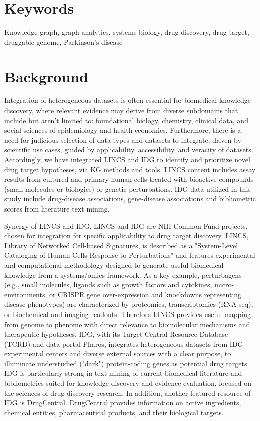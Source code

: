 \section{Keywords}
Knowledge graph, graph analytics, systems biology, drug discovery, drug target, druggable genome, Parkinson's disease

\section{Background}

Integration of heterogeneous datasets is often essential for biomedical knowledge discovery, where relevant evidence may derive from diverse subdomains that include but aren't limited to: foundational biology, chemistry, clinical data, and social sciences of epidemiology and health economics. Furthermore, there is a need for judicious selection of data types and datasets to integrate, driven by scientific use cases, guided by applicability, accessibility, and veracity of datasets. Accordingly, we have integrated LINCS and IDG to identify and prioritize novel drug target hypotheses, via KG methods and tools. LINCS content includes assay results from cultured and primary human cells treated with bioactive compounds (small molecules or biologics) or genetic perturbations. IDG data utilized in this study include drug-disease associations, gene-disease associations and bibliometric scores from literature text mining.

Synergy of LINCS and IDG. LINCS and IDG are NIH Common Fund\cite{National_Institutes_of_Health_US_Department_of_Health_and_Human_Services_undated-jt} projects, chosen for integration for specific applicability to drug target discovery. LINCS, Library of Networked Cell-based Signatures, is described as a "System-Level Cataloging of Human Cells Response to Perturbations"\cite{Keenan2018-sf} and features experimental and computational methodology designed to generate useful biomedical knowledge from a systems/omics framework. As a key example, perturbagens (e.g., small molecules, ligands such as growth factors and cytokines, micro-environments, or CRISPR gene over-expression and knockdowns representing disease phenotypes) are characterized by proteomics, transcriptomics (RNA-seq), or biochemical and imaging readouts. Therefore LINCS provides useful mapping from genome to phenome with direct relevance to biomolecular mechanisms and therapeutic hypotheses. IDG\cite{Oprea2018-cp}, with its Target Central Resource Database (TCRD) and data portal Pharos\cite{Nguyen2017-lo}, integrates heterogeneous datasets from IDG experimental centers and diverse external sources with a clear purpose, to illuminate understudied ("dark") protein-coding genes as potential drug targets. IDG is particularly strong in text mining of current biomedical literature and bibliometrics suited for knowledge discovery and evidence evaluation, focused on the sciences of drug discovery research. In addition, another featured resource of IDG is DrugCentral\cite{Avram2021-wd}. DrugCentral provides information on active ingredients, chemical entities, pharmaceutical products, and their biological targets.

